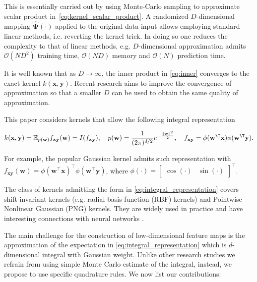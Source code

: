  
This is essentially carried out by using Monte-Carlo sampling to approximate scalar product in~\eqref{eq:kernel_scalar_product}. A randomized $D$-dimensional mapping $\mathbf{\hat{\Psi}}(\cdot)$ applied to the original data input allows employing standard linear methods, i.e. reverting the kernel trick. In doing so one reduces the complexity to that of linear methods, e.g. $D$-dimensional approximation admits $\mathcal{O}(ND^2)$ training time, $\mathcal{O}(ND)$ memory and  $\mathcal{O}(N)$ prediction time.

It is well known that as $D \rightarrow \infty$, the inner product in \eqref{eq:inner} converges to the exact kernel $k(\mathbf{x, y})$. Recent research \citep{yang2014quasi, felix2016orthogonal, choromanski2016recycling} aims to improve the convergence of approximation so that a smaller $D$ can be used to obtain the same quality of approximation.  

This paper considers kernels that allow the following integral representation

\begin{equation}
\label{eq:integral_representation}
k(\mathbf{x}, \mathbf{y}) = 
\mathbb{E}_{p(\mathbf{w})} f_{\mathbf{xy}}(\mathbf{w}) =
I(f_{\mathbf{xy}}),
\quad p(\mathbf{w}) = \frac{1}{(2 \pi)^{d/2}} e^{-\frac{\|\mathbf{w}\|^2}{2}},
\quad f_{\mathbf{xy}} = \phi(\mathbf{w}^{\T}\mathbf{x})
\phi(\mathbf{w}^{\T} \mathbf{y}).
\end{equation}

For example, the popular Gaussian kernel admits such representation with ${f_{\mathbf{xy}}(\mathbf{w}) = \phi(\mathbf{w}^{\boldsymbol{\top}}\mathbf{x})^{\boldsymbol{\top}} \phi(\mathbf{w}^{\boldsymbol{\top}}\mathbf{y})}$, where $\phi(\cdot) =

\begin{bmatrix}\cos(\cdot) & \sin(\cdot) \end{bmatrix}

^{\boldsymbol{\top}}$.

The class of kernels admitting the form in \eqref{eq:integral_representation} covers shift-invariant kernels (e.g. radial basis function (RBF) kernels) and Pointwise Nonlinear Gaussian (PNG) kernels. They are widely used in practice and have interesting connections with neural networks \citep{cho2009kernel, williams1997computing}.

The main challenge for the construction of low-dimensional feature maps is the approximation of the expectation in \eqref{eq:integral_representation} which is $d$-dimensional integral with Gaussian weight. Unlike other research studies we refrain from using simple Monte Carlo estimate of the integral, instead, we propose to use specific quadrature rules. We now list our contributions:

